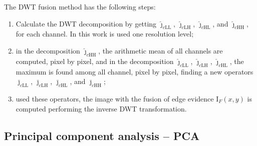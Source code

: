 \documentclass[journal]{IEEEtran}
\begin{document}
The DWT fusion method has the following steps:
\begin{enumerate}
\item Calculate the DWT decomposition by getting $\bm{\widehat\jmath}_{c\text{LL}}$, $\bm{\widehat\jmath}_{c\text{LH}}$, $\bm{\widehat\jmath}_{c\text{HL}}$, and $\bm{\widehat\jmath}_{c\text{HH}}$, for each channel. In this work is used one resolution level;
\item in the decomposition $\bm{\widehat\jmath}_{c\text{HH}}$, the arithmetic mean of all channels are computed, pixel by pixel, and in the decomposition $\bm{\widehat\jmath}_{c\text{LL}}$, $\bm{\widehat\jmath}_{c\text{LH}}$, $\bm{\widehat\jmath}_{c\text{HL}}$, the maximum is found among all channel, pixel by pixel, finding a new operators $\bm{\bar\jmath}_{c\text{LL}}$, $\bm{\bar\jmath}_{c\text{LH}}$, $\bm{\bar\jmath}_{c\text{HL}}$, and $\bm{\bar\jmath}_{c\text{HH}}$;
\item used these operators, the image with the fusion of edge evidence $\text{I}_F(x, y)$ is computed performing the inverse DWT transformation.
\end{enumerate}

\subsection{Principal component analysis -- PCA}
\end{document}
